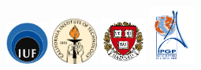 \documentclass[oneside,english,onecolumn,letterpaper]{book}
\begin{document}
\begin{figure}[htbp]
\begin{center}
\includegraphics[width=0.125\textwidth]{figures/logo_IUF}
\includegraphics[width=0.135\textwidth]{figures/logo_Caltech}
\includegraphics[width=0.135\textwidth]{figures/logo_Harvard}
\includegraphics[width=0.135\textwidth]{figures/logo_IPGP}
\end{center}

\vspace*{2truemm}


\end{figure}
\end{document}

